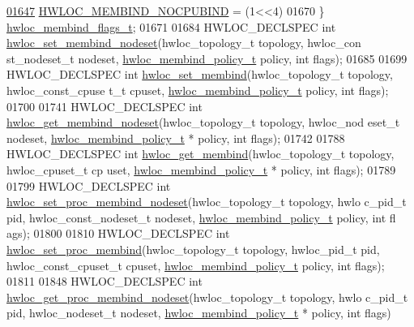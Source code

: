 \begin{DoxyCode}
\hypertarget{a00033_source_l01647}{}\hyperlink{a00050_ggab00475fd98815bf4fb9aaf752030e7d2aad6b9eaf2ee324ca58dc8f58094b9997}{01647}   \hyperlink{a00050_ggab00475fd98815bf4fb9aaf752030e7d2aad6b9eaf2ee324ca58dc8f58094b9997}{HWLOC_MEMBIND_NOCPUBIND} =     (1<<4)  
01670 \} \hyperlink{a00050_gab00475fd98815bf4fb9aaf752030e7d2}{hwloc_membind_flags_t};
01671 
01684 HWLOC\_DECLSPEC \textcolor{keywordtype}{int} \hyperlink{a00050_ga747962cbb16fd12ad6d126011c734a27}{hwloc_set_membind_nodeset}(hwloc\_topology\_t topology, hwloc\_con
      st\_nodeset\_t nodeset, \hyperlink{a00050_gac9764f79505775d06407b40f5e4661e8}{hwloc_membind_policy_t} policy, \textcolor{keywordtype}{int} flags);
01685 
01699 HWLOC\_DECLSPEC \textcolor{keywordtype}{int} \hyperlink{a00050_ga8b6d1d90227aff8e44ef26bc1f8a8f95}{hwloc_set_membind}(hwloc\_topology\_t topology, hwloc\_const\_cpuse
      t\_t cpuset, \hyperlink{a00050_gac9764f79505775d06407b40f5e4661e8}{hwloc_membind_policy_t} policy, \textcolor{keywordtype}{int} flags);
01700 
01741 HWLOC\_DECLSPEC \textcolor{keywordtype}{int} \hyperlink{a00050_ga7b46a4ca0b2db9723ca73b0c148ccd93}{hwloc_get_membind_nodeset}(hwloc\_topology\_t topology, hwloc\_nod
      eset\_t nodeset, \hyperlink{a00050_gac9764f79505775d06407b40f5e4661e8}{hwloc_membind_policy_t} * policy, \textcolor{keywordtype}{int} flags);
01742 
01788 HWLOC\_DECLSPEC \textcolor{keywordtype}{int} \hyperlink{a00050_gab07aedba1119f99130e5f0b796b7d8a5}{hwloc_get_membind}(hwloc\_topology\_t topology, hwloc\_cpuset\_t cp
      uset, \hyperlink{a00050_gac9764f79505775d06407b40f5e4661e8}{hwloc_membind_policy_t} * policy, \textcolor{keywordtype}{int} flags);
01789 
01799 HWLOC\_DECLSPEC \textcolor{keywordtype}{int} \hyperlink{a00050_gaf10d18cd4703ec980d7440a1c23fa07f}{hwloc_set_proc_membind_nodeset}(hwloc\_topology\_t topology, hwlo
      c\_pid\_t pid, hwloc\_const\_nodeset\_t nodeset, \hyperlink{a00050_gac9764f79505775d06407b40f5e4661e8}{hwloc_membind_policy_t} policy, \textcolor{keywordtype}{int} fl
      ags);
01800 
01810 HWLOC\_DECLSPEC \textcolor{keywordtype}{int} \hyperlink{a00050_gac63c4517e71b3f0d41b3dee3e83dc55c}{hwloc_set_proc_membind}(hwloc\_topology\_t topology, hwloc\_pid\_t 
      pid, hwloc\_const\_cpuset\_t cpuset, \hyperlink{a00050_gac9764f79505775d06407b40f5e4661e8}{hwloc_membind_policy_t} policy, \textcolor{keywordtype}{int} flags);
01811 
01848 HWLOC\_DECLSPEC \textcolor{keywordtype}{int} \hyperlink{a00050_ga22074ed072e1039f74f17f7b16e9e39d}{hwloc_get_proc_membind_nodeset}(hwloc\_topology\_t topology, hwlo
      c\_pid\_t pid, hwloc\_nodeset\_t nodeset, \hyperlink{a00050_gac9764f79505775d06407b40f5e4661e8}{hwloc_membind_policy_t} * policy, \textcolor{keywordtype}{int} flags)

\end{DoxyCode}
